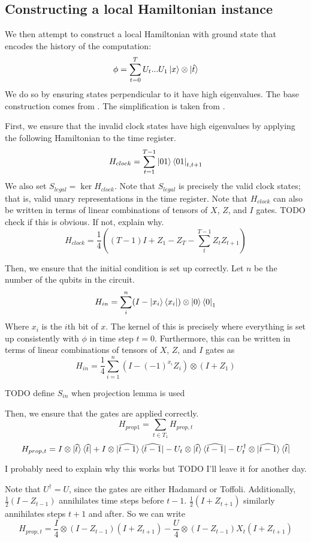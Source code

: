 \subsection{Constructing a local Hamiltonian instance}

We then attempt to construct a local Hamiltonian with ground state that encodes the history of the computation: $$\phi=\sum_{t=0}^TU_t...U_1\ket{x}\otimes\ket{\hat{t}}$$
We do so by ensuring states perpendicular to it have high eigenvalues. The base construction comes from \cite{kitaev2002classical}. The simplification is taken from \cite{biamonte_love_2008}.

First, we ensure that the invalid clock states have high eigenvalues by applying the following Hamiltonian to the time register.
$$H_{clock}=\sum_{t=1}^{T-1}\ket{01}\bra{01}_{t,t+1}$$
We also set $S_{legal}=\ker H_{clock}$. Note that $S_{legal}$ is precisely the valid clock states; that is, valid unary representations in the time register. Note that $H_{clock}$ can also be written in terms of linear combinations of tensors of $X$, $Z$, and $I$ gates. TODO check if this is obvious. If not, explain why.
$$H_{clock}=\frac{1}{4}((T-1)I + Z_1 - Z_T - \sum_t^{T-1}Z_tZ_{t+1})$$

Then, we ensure that the initial condition is set up correctly. Let $n$ be the number of the qubits in the circuit.
$$H_{in}=\sum_i^n(I-\ket{x_i}\bra{x_i})\otimes\ket{0}\bra{0}_1$$
Where $x_i$ is the $i$th bit of $x$. The kernel of this is precisely where everything is set up consistently with $\phi$ in time step $t=0$. Furthermore, this can be written in terms of linear combinations of tensors of $X$, $Z$, and $I$ gates as
$$H_{in}=\frac{1}{4}\sum_{i=1}^n(I-(-1)^{x_i}Z_i)\otimes(I+Z_1)$$

TODO define $S_{in}$ when projection lemma is used

Then, we ensure that the gates are applied correctly.
$$H_{prop1}=\sum_{t\in T_1}H_{prop,t}$$
$$H_{prop,t}=I\otimes\ket{\widehat{t}}\bra{\widehat{t}}
	+I\otimes\ket{\widehat{t-1}}\bra{\widehat{t-1}}
	-U_t\otimes\ket{\widehat{t}}\bra{\widehat{t-1}}
	-U_t^\dagger\otimes\ket{\widehat{t-1}}\bra{\widehat{t}}$$

I probably need to explain why this works but TODO I'll leave it for another day.

Note that $U^\dagger=U$, since the gates are either Hadamard or Toffoli. Additionally, $\frac{1}{2}(I-Z_{t-1})$ annihilates time steps before $t-1$. $\frac{1}{2}(I+Z_{t+1})$ similarly annihilates steps $t+1$ and after.
So we can write
$$H_{prop,t}=\frac{I}{4}\otimes(I-Z_{t-1})(I+Z_{t+1})-\frac{U}{4}\otimes(I-Z_{t-1})X_t(I+Z_{t+1})$$

